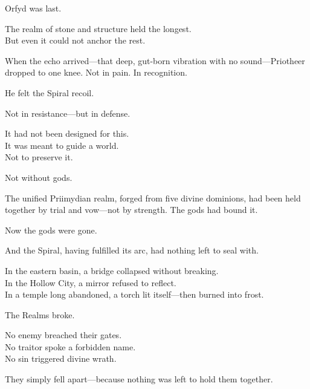 \documentclass[9pt]{article}
\begin{document}
\vspace{0.5em}
Orfyd was last.

\vspace{0.5em}
The realm of stone and structure held the longest.\\
But even it could not anchor the rest.

\vspace{0.5em}
When the echo arrived---that deep, gut-born vibration with no sound---Priotheer dropped to one knee. Not in pain. In recognition.

\vspace{0.5em}
He felt the Spiral recoil.

\vspace{0.5em}
Not in resistance---but in defense.

\vspace{0.5em}
It had not been designed for this.\\
It was meant to guide a world.\\
Not to preserve it.

\vspace{0.5em}
Not without gods.

\vspace{0.5em}
The unified Priimydian realm, forged from five divine dominions, had been held together by trial and vow---not by strength. The gods had bound it.

\vspace{0.5em}
Now the gods were gone.

\vspace{0.5em}
And the Spiral, having fulfilled its arc, had nothing left to seal with.

\vspace{0.5em}
In the eastern basin, a bridge collapsed without breaking.\\
In the Hollow City, a mirror refused to reflect.\\
In a temple long abandoned, a torch lit itself---then burned into frost.

\vspace{0.5em}
The Realms broke.

\vspace{0.5em}
No enemy breached their gates.\\
No traitor spoke a forbidden name.\\
No sin triggered divine wrath.

\vspace{0.5em}
They simply fell apart---because nothing was left to hold them together.
\end{document}
